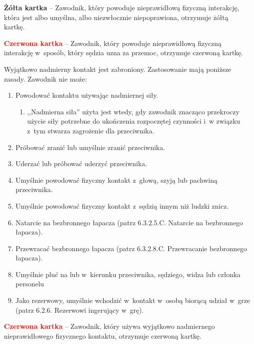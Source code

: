 \documentclass[12pt,a4paper]{article}
\renewcommand{\paragraph}[1]{
  \oldparagraph{#1}%
  \leftskip2cm
}
\newcommand\redcard[1]{\bgroup\textcolor{red}{\textbf{#1}}}
\newcommand\yellowcard[1]{\bgroup\textcolor{darkyellow}{\textbf{#1}}}
\begin{document}
\yellowcard{Żółta kartka} -- Zawodnik, który powoduje nieprawidłową fizyczną
interakcję, która jest albo umyślna, albo niezwłocznie niepoprawiona,
otrzymuje żółtą kartkę.

\redcard{Czerwona kartka} -- Zawodnik, który powoduje nieprawidłową fizyczną
interakcję w~sposób, który sędzia uzna za przemoc, otrzymuje czerwoną
kartkę.

\paragraph{Wyjątkowo nadmierny kontakt}
Wyjątkowo nadmierny
kontakt jest zabroniony. Zastosowanie mają poniższe zasady. Zawodnik nie
może:

\begin{enumerate}
	\item
	      Powodować kontaktu używając nadmiernej siły.

	      \begin{enumerate}
		      \item
		            ,,Nadmierna siła'' użyta jest wtedy, gdy zawodnik znacząco
		            przekroczy użycie siły potrzebne do ukończenia rozpoczętej czynności
		            i~w związku z~tym stwarza zagrożenie dla przeciwnika.
	      \end{enumerate}
	\item
	      Próbować zranić lub umyślnie zranić przeciwnika.
	\item
	      Uderzać lub próbować uderzyć przeciwnika.
	\item
	      Umyślnie powodować fizyczny kontakt z~głową, szyją lub pachwiną
	      przeciwnika.
	\item
	      Umyślnie powodować fizyczny kontakt z~sędzią innym niż ludzki znicz.
	\item
	      Natarcie na bezbronnego łapacza (patrz 6.3.2.5.C. Natarcie na
	      bezbronnego łapacza).
	\item
	      Przewracać bezbronnego łapacza (patrz 6.3.2.8.C. Przewracanie
	      bezbronnego łapacza).
	\item
	      Umyślnie pluć na lub w~kierunku przeciwnika, sędziego, widza lub
	      członka personelu
	\item
	      Jako rezerwowy, umyślnie wchodzić w~kontakt w~osobą biorącą udział w~grze (patrz 6.2.6. Rezerwowi ingerujący w~grę).
\end{enumerate}

\redcard{Czerwona kartka} -- Zawodnik, który używa wyjątkowo nadmiernego
nieprawidłowego fizycznego kontaktu, otrzymuje czerwoną kartkę.
\end{document}
